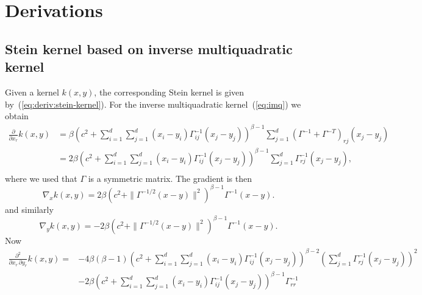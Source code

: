 \documentclass[11pt,a4paper]{report}
\begin{document}



\appendix
\chapter{Derivations}
\label{appendix:derivations}

\section{Stein kernel based on inverse multiquadratic kernel}
\label{appendix:derivations:imq-stein}

Given a kernel $k(x,y)$, the corresponding Stein kernel is given by~(\ref{eq:deriv:stein-kernel}). For the inverse multiquadratic kernel~(\ref{eq:imq}) we obtain
\begin{equation}
\begin{aligned}
\frac{\partial}{\partial x_r} k(x,y) 
&= \beta \left(c^2 + \sum_{i=1}^d\sum_{j=1}^d (x_i-y_i) \Gamma^{-1}_{ij}(x_j-y_j)\right)^{\beta-1}
\sum_{j=1}^d (\Gamma^{-1} + \Gamma^{-T})_{rj}(x_j - y_j) \\
&= 2 \beta \left(c^2 + \sum_{i=1}^d\sum_{j=1}^d (x_i-y_i) \Gamma^{-1}_{ij}(x_j-y_j)\right)^{\beta-1}
\sum_{j=1}^d \Gamma^{-1}_{rj}(x_j - y_j), \\
\end{aligned}
\end{equation}
where we used that $\Gamma$ is a symmetric matrix. The gradient is then
\begin{equation}
\nabla_x k(x,y) = 2 \beta \left(c^2 + \| \Gamma^{-1/2} (x-y)\|^2\right)^{\beta-1} \Gamma^{-1} (x - y).
\label{eq:appx:deviv:nablax}
\end{equation}
and similarly
\begin{equation}
\nabla_y k(x,y) = -2 \beta \left(c^2 + \| \Gamma^{-1/2} (x-y)\|^2\right)^{\beta-1} \Gamma^{-1} (x - y).
\label{eq:appx:deviv:nablay}
\end{equation}
Now
\begin{equation}
\begin{aligned}
\frac{\partial^2}{\partial x_r\,\partial y_r} k(x,y) 
= &-4 \beta(\beta-1) \left(c^2 + \sum_{i=1}^d\sum_{j=1}^d (x_i-y_i) \Gamma^{-1}_{ij}(x_j-y_j)\right)^{\beta-2} \left(\sum_{j=1}^d \Gamma^{-1}_{rj}(x_j - y_j)\right)^2 \\
&- 2\beta \left(c^2 + \sum_{i=1}^d\sum_{j=1}^d (x_i-y_i) \Gamma^{-1}_{ij}(x_j-y_j)\right)^{\beta-1} \Gamma^{-1}_{rr}
\end{aligned}
\end{equation}
\end{document}
